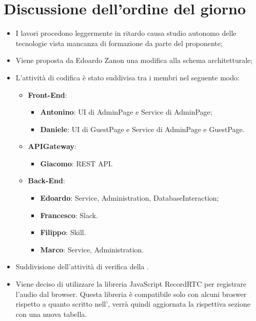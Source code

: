 \documentclass[../verbale-2017-03-20.tex]{subfiles}
\begin{document}
	\section{Discussione dell'ordine del giorno}
	\begin{itemize}
		\item I lavori procedono leggermente in ritardo causa studio autonomo delle tecnologie vista mancanza di formazione da parte del proponente;
		\item Viene proposta da Edoardo Zanon una modifica alla schema architetturale;
		\item L'attività di codifica è stato suddivisa tra i membri nel seguente modo:
			\begin{itemize}
				\item \textbf{Front-End}:
					\begin{itemize}
						\item \textbf{Antonino}: UI di AdminPage e Service di AdminPage;
						\item \textbf{Daniele}: UI di GuestPage e Service di AdminPage e GuestPage.
					\end{itemize}
				\item \textbf{APIGateway}:
					\begin{itemize}
						\item \textbf{Giacomo}: REST API.
					\end{itemize}
				\item \textbf{Back-End}:
					\begin{itemize}
						\item \textbf{Edoardo}: Service, Administration, DatabaseInteraction;
						\item \textbf{Francesco}: Slack.
						\item \textbf{Filippo}: Skill.
						\item \textbf{Marco}: Service, Administration.
					\end{itemize}
			\end{itemize}
		\item Suddivisione dell'attività di verifica della .
		\item Viene deciso di utilizzare la libreria JavaScript RecordRTC per registrare l'audio dal browser. Questa libreria è compatibile solo con alcuni broswer rispetto a quanto scritto nell'\analisideirequisiti, verrà quindi aggiornata la rispettiva sezione con una nuova tabella.
	\end{itemize}
\end{document}
